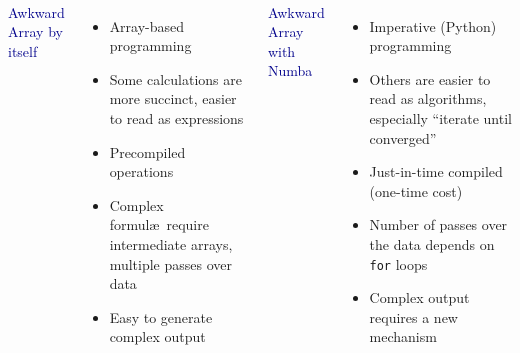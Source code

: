 \documentclass[aspectratio=169]{beamer}
\begin{document}
\begin{frame}{\mbox{ }}
\vspace{0.5 cm}
\large
\begin{columns}

\textcolor{darkblue}{\Large Awkward Array by itself}

\vspace{0.25 cm}
\begin{itemize}\setlength{\itemsep}{0.2 cm}
\item<1-> Array-based programming
\item<2-> Some calculations are more succinct, easier to read as expressions
\item<3-> Precompiled operations
\item<4-> Complex formul\ae\ require intermediate arrays, multiple passes over data
\item<5-> Easy to generate complex output \mbox{\hspace{2 cm}}
\end{itemize}

\textcolor{darkblue}{\Large Awkward Array with Numba}

\vspace{0.25 cm}
\begin{itemize}\setlength{\itemsep}{0.2 cm}
\item<1-> Imperative (Python) programming
\item<2-> Others are easier to read as algorithms, especially ``iterate until converged''
\item<3-> Just-in-time compiled (one-time cost)
\item<4-> Number of passes over the data depends on \texttt{for} loops
\item<5-> Complex output requires a new mechanism
\end{itemize}
\end{columns}
\end{frame}
\end{document}
